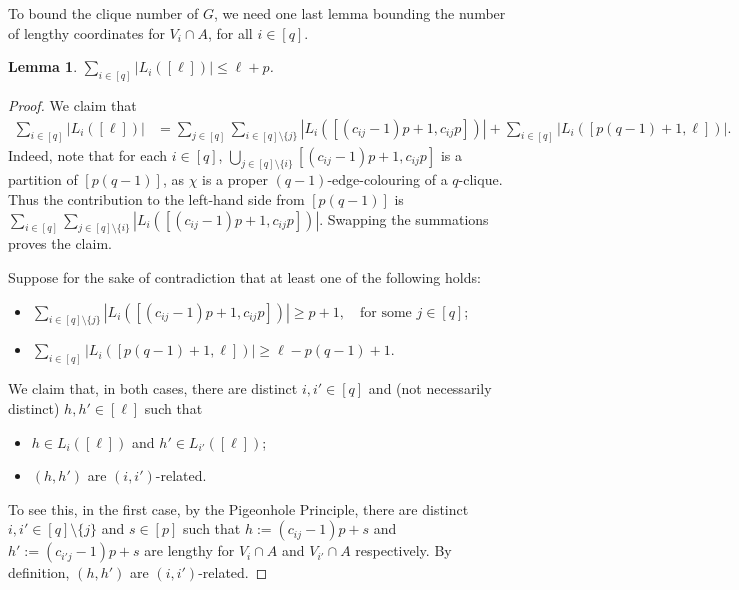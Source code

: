 \documentclass[11pt, a4paper]{article}
\newtheorem{lemma}[theorem]{Lemma}
\newtheorem{observation}[theorem]{Observation}
\theoremstyle{definition}
\begin{document}

To bound the clique number of $G$, we need one last lemma bounding the number of lengthy coordinates for $V_i\cap A$, for all $i\in[q]$.


\begin{lemma}\label{lem-allgoodcoord}
	$\sum_{i \in [q]}|L_i([\ell])| \leq \ell+p$.
\end{lemma}

\begin{proof}
	We claim that
	\begin{align*}
	\sum_{i \in [q]}|L_i([\ell])| &= \sum_{j \in [q]}\sum_{i \in [q]\setminus\{ j\}}|L_i([(c_{ij}-1)p+1,c_{ij}p])|+ \sum_{i \in [q]}|L_i([p(q-1)+1,\ell])|.
	\end{align*}
	Indeed, note that for each $i\in[q]$, $\bigcup_{j\in [q]\setminus\{i\}}[(c_{ij}-1)p+1,c_{ij}p]$ is a partition of $[p(q-1)]$, as $\chi$ is a proper $(q-1)$-edge-colouring of a $q$-clique. Thus the contribution to the left-hand side from $[p(q-1)]$ is $\sum_{i \in [q]}\sum_{j \in [q]\setminus\{ i\}}|L_i([(c_{ij}-1)p+1,c_{ij}p])|$. Swapping the summations proves the claim.
	
	Suppose for the sake of contradiction that at least one of the following holds:
	\begin{itemize}
		\item $\sum_{i \in [q]\setminus\{j\}}|L_i([(c_{ij}-1)p+1,c_{ij}p])| \geq p+1,\quad\text{for some } j \in [q]$;
		\item $\sum_{i \in [q]}|L_i([p(q-1)+1,\ell])| \geq \ell-p(q-1)+1$.
	\end{itemize}
	We claim that, in both cases, there are distinct $i,i' \in [q]$ and (not necessarily distinct) $h,h'\in[\ell]$ such that
	\begin{itemize}
		\item[(i)] $h\in L_i([\ell])$ and $h' \in L_{i'}([\ell])$;
		\item[(ii)] $(h,h')$ are $(i,i')$-related.
	\end{itemize}
	
	To see this, in the first case, by the Pigeonhole Principle, there are distinct $i,i' \in [q]\setminus\lbrace j\rbrace$ and $s \in [p]$ such that $h:=(c_{ij}-1)p+s$ and $h':=(c_{i'j}-1)p+s$ are lengthy for $V_i \cap A$ and $V_{i'} \cap A$ respectively. By definition, $(h,h')$ are $(i,i')$-related.
	

\end{proof}
\end{document}
